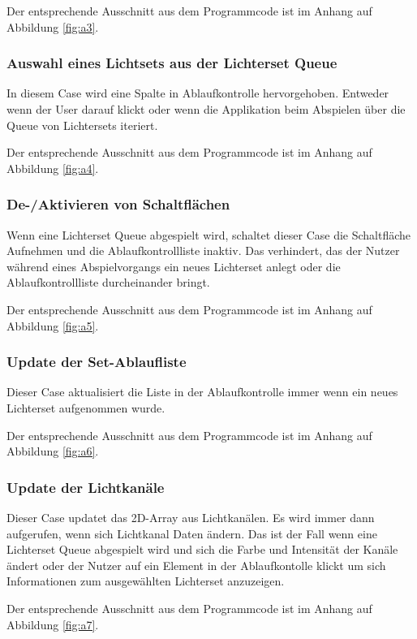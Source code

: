 Der entsprechende Ausschnitt aus dem Programmcode ist im Anhang auf Abbildung \ref{fig:a3}.

\subsubsection{Auswahl eines Lichtsets aus der Lichterset Queue}
In diesem Case wird eine Spalte in Ablaufkontrolle hervorgehoben. Entweder wenn der User darauf klickt oder wenn die Applikation beim Abspielen über die Queue von Lichtersets iteriert. 

Der entsprechende Ausschnitt aus dem Programmcode ist im Anhang auf Abbildung \ref{fig:a4}.
 
\subsubsection{De-/Aktivieren von Schaltflächen}
Wenn eine Lichterset Queue abgespielt wird, schaltet dieser Case die Schaltfläche Aufnehmen und die Ablaufkontrollliste inaktiv. Das verhindert, das der Nutzer während eines Abspielvorgangs ein neues Lichterset anlegt oder die Ablaufkontrollliste durcheinander bringt.

Der entsprechende Ausschnitt aus dem Programmcode ist im Anhang auf Abbildung \ref{fig:a5}.

\subsubsection{Update der Set-Ablaufliste}
Dieser Case aktualisiert die Liste in der Ablaufkontrolle immer wenn ein neues Lichterset aufgenommen wurde.

Der entsprechende Ausschnitt aus dem Programmcode ist im Anhang auf Abbildung \ref{fig:a6}.

\subsubsection{Update der Lichtkanäle}
Dieser Case updatet das 2D-Array aus Lichtkanälen. Es wird immer dann aufgerufen, wenn sich Lichtkanal Daten ändern. Das ist der Fall wenn eine Lichterset Queue abgespielt wird und sich die Farbe und Intensität der Kanäle ändert oder der Nutzer auf ein Element in der Ablaufkontolle klickt um sich Informationen zum ausgewählten Lichterset anzuzeigen.

Der entsprechende Ausschnitt aus dem Programmcode ist im Anhang auf Abbildung \ref{fig:a7}.


